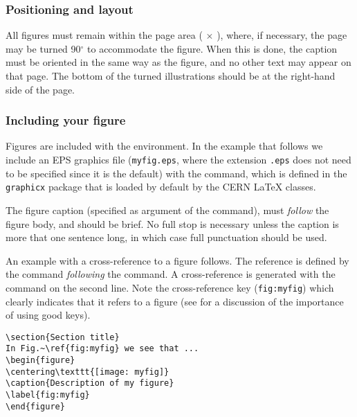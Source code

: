 \documentclass{cernrep}
\begin{document}
\subsubsection{Positioning and layout}

All figures must remain within the page area ( $\times$
), where, if necessary, the page may be turned 90$^\circ$
to accommodate the figure. When this is done, the caption must be
oriented in the same way as the figure, and no other text may appear
on that page.  The bottom of the turned illustrations should be at the
right-hand side of the page.

\subsubsection{Including your figure}

Figures are included with the  environment. In the
example that follows we include an EPS graphics file
(\texttt{myfig.eps}, where the extension \texttt{.eps} does not need
to be specified since it is the default) with the
 command, which is defined in the
\texttt{graphicx} package that is loaded by default by the CERN
\LaTeX{} classes.

The figure caption (specified as argument of the 
command), must \emph{follow} the figure body, and should be brief. No
full stop is necessary unless the caption is more that one sentence
long, in which case full punctuation should be used.


An example with a cross-reference to a figure follows. The reference
is defined by the  command \emph{following} the
 command. A cross-reference is generated with the
 command on the second line. Note the cross-reference key
(\texttt{fig:myfig}) which clearly indicates that it refers to a
figure (see  for a discussion of the importance of
using good keys).
\begin{verbatim}
\section{Section title}
In Fig.~\ref{fig:myfig} we see that ...
\begin{figure}
\centering\texttt{[image: myfig]}
\caption{Description of my figure}
\label{fig:myfig}
\end{figure}
\end{verbatim}
\end{document}
